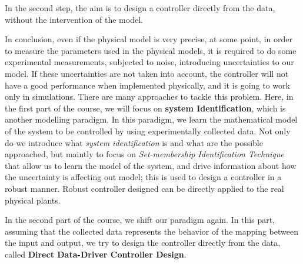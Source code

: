     In the second step, the aim is to design a controller directly from the data, without the intervention of the model.


\begin{factbox}

    In conclusion, even if the physical model is very precise, at some point, in order to measure the parameters used in the physical models, it is required to do some experimental measurements, subjected to noise, introducing uncertainties to our model.\newline \newline
    If these uncertainties are not taken into account, the controller will not have a good performance when implemented physically, and it is going to work only in simulations. \newline \newline
    There are many approaches to tackle this problem. Here, in the first part of the course, we will focus on \textbf{system Identification}, which is another modelling paradigm. In this paradigm, we learn the mathematical model of the system to be controlled by using experimentally collected data. Not only do we introduce what \textit{system identification} is and what are the possible approached, but maintly to focus on \textit{Set-membership Identification Technique} that allow us to learn the model of the system, and drive information about how the uncertainty is affecting out model; this is used to design a controller in a robust manner. Robust controller designed can be directly applied to the real physical plants.  \newline \newline
    
    In the second part of the course, we shift our paradigm again. In this part, assuming that the collected data represents the behavior of the mapping between the input and output, we try to design the controller directly from the data, called  \textbf{Direct Data-Driver Controller Design}. \newline \newline
    
\end{factbox}

